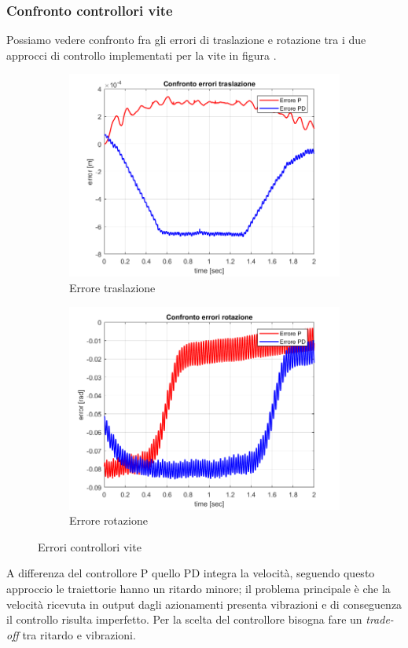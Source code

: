 \subsubsection{Confronto controllori vite}	
Possiamo vedere confronto fra gli errori di traslazione e rotazione tra i due approcci di controllo implementati per la vite in figura \label{fig:errVite}.
\begin{figure}
	\begin{subfigure}{.5\textwidth}
		\includegraphics[width=1\linewidth]{Immagini/Traiettorie/errTras}  
		\caption{Errore traslazione}
		\label{fig:sub-errT}
	\end{subfigure}
	\begin{subfigure}{.5\textwidth}
		\includegraphics[width=1\linewidth]{Immagini/Traiettorie/errRot}  
		\caption{Errore rotazione}
		\label{fig:sub-errR}
	\end{subfigure}
	\caption{Errori controllori vite}
	\label{fig:errVite}
\end{figure}
A differenza del controllore P quello PD integra la velocità, seguendo questo approccio le traiettorie hanno un ritardo minore; il problema principale è che la velocità ricevuta in output dagli azionamenti presenta vibrazioni e di conseguenza il controllo risulta imperfetto. Per la scelta del controllore bisogna fare un \textit{trade-off} tra ritardo e vibrazioni.
